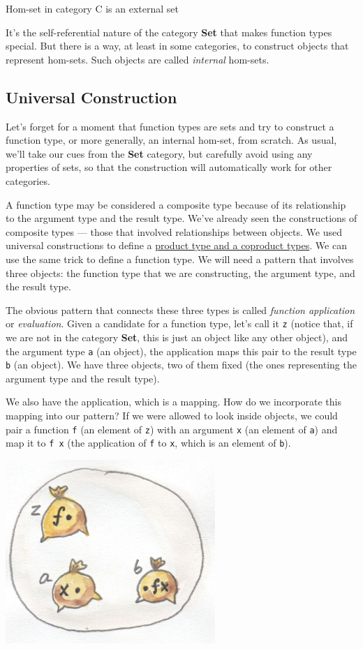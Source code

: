 Hom-set in category C is an external set

It's the self-referential nature of the category \textbf{Set} that makes
function types special. But there is a way, at least in some categories,
to construct objects that represent hom-sets. Such objects are called
\emph{internal} hom-sets.

\subsection{Universal Construction}\label{universal-construction}

Let's forget for a moment that function types are sets and try to
construct a function type, or more generally, an internal hom-set, from
scratch. As usual, we'll take our cues from the \textbf{Set} category,
but carefully avoid using any properties of sets, so that the
construction will automatically work for other categories.

A function type may be considered a composite type because of its
relationship to the argument type and the result type. We've already
seen the constructions of composite types --- those that involved
relationships between objects. We used universal constructions to define
a
\href{https://bartoszmilewski.com/2015/01/07/products-and-coproducts/}{product
type and a coproduct types}. We can use the same trick to define a
function type. We will need a pattern that involves three objects: the
function type that we are constructing, the argument type, and the
result type.

The obvious pattern that connects these three types is called
\emph{function application} or \emph{evaluation}. Given a candidate for
a function type, let's call it \texttt{z} (notice that, if we are not in
the category \textbf{Set}, this is just an object like any other
object), and the argument type \texttt{a} (an object), the application
maps this pair to the result type \texttt{b} (an object). We have three
objects, two of them fixed (the ones representing the argument type and
the result type).

We also have the application, which is a mapping. How do we incorporate
this mapping into our pattern? If we were allowed to look inside
objects, we could pair a function \texttt{f} (an element of \texttt{z})
with an argument \texttt{x} (an element of \texttt{a}) and map it to
\texttt{f\ x} (the application of \texttt{f} to \texttt{x}, which is an
element of \texttt{b}).

\hypertarget{attachment_4243}{}
\includegraphics[width=3.12500in]{images/functionset.jpg}

